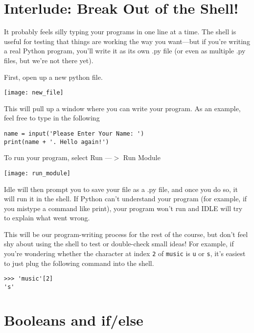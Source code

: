 \section*{Interlude: Break Out of the Shell!}

It probably feels silly typing your programs in one line at a time. The shell is useful for testing that things are working the way you want—but if you’re writing a real Python program, you’ll write it as its own .py file (or even as multiple .py files, but we’re not there yet).

First, open up a new python file.

\begin{center}
	\texttt{[image: new\_file]}
\end{center}

This will pull up a window where you can write your program. As an example, feel free to type in the following

\begin{lstlisting}
name = input('Please Enter Your Name: ')
print(name + '. Hello again!')
\end{lstlisting}

To run your program, select Run ---$>$ Run Module

\begin{center}
	\texttt{[image: run\_module]}
\end{center}

Idle will then prompt you to save your file as a .py file, and once you do so, it will run it in the shell. If Python can’t understand your program (for example, if you mistype a command like print), your program won’t run and IDLE will try to explain what went wrong.

This will be our program-writing process for the rest of the course, but don’t feel shy about using the shell to test or double-check small ideas! For example, if you’re wondering whether the character at index \texttt{2} of \texttt{\textquotesingle music\textquotesingle} is \texttt{\textquotesingle u\textquotesingle} or \texttt{\textquotesingle s\textquotesingle}, it’s easiest to just plug the following command into the shell. 

\begin{lstlisting}[numbers=none]
>>> 'music'[2]
's'
\end{lstlisting}


\section*{Booleans and if/else}

